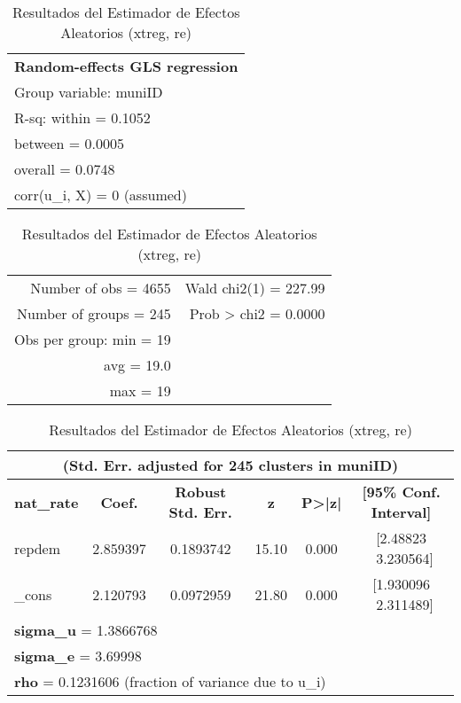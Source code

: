 \documentclass[12pt]{article}
\begin{document}
\begin{table}[H] %
    \centering
    \caption{Resultados del Estimador de Efectos Aleatorios (xtreg, re)}
    \begin{tabular}{l l r}
        \multicolumn{3}{l}{\textbf{Random-effects GLS regression}} \\
        \multicolumn{3}{l}{Group variable: muniID} \\
        \hline
        \multicolumn{3}{l}{R-sq: \hspace{5mm} within = 0.1052} \\
        \multicolumn{3}{l}{\hspace{17mm} between = 0.0005} \\
        \multicolumn{3}{l}{\hspace{17mm} overall = 0.0748} \\
        \multicolumn{3}{l}{corr(u\_i, X) = 0 (assumed)} \\
    \end{tabular}
    \begin{tabular}{r @{\hskip 1cm} r}
        Number of obs = 4655 & Wald chi2(1) = 227.99 \\
        Number of groups = 245 & Prob > chi2 = 0.0000 \\
        Obs per group: min = 19 & \\
        \hspace{16mm} avg = 19.0 & \\
        \hspace{16mm} max = 19 & \\
    \end{tabular}

    \vspace{0.2cm}
    \begin{tabular}{l c c c c c}
        \multicolumn{6}{c}{(Std. Err. adjusted for 245 clusters in muniID)} \\
        \hline
        \textbf{nat\_rate} & \textbf{Coef.} & \textbf{Robust Std. Err.} & \textbf{z} & \textbf{P>|z|} & \textbf{[95\% Conf. Interval]} \\
        \hline
        repdem & 2.859397 & 0.1893742 & 15.10 & 0.000 & [2.48823 \ 3.230564] \\
        \_cons & 2.120793 & 0.0972959 & 21.80 & 0.000 & [1.930096 \ 2.311489] \\
        \hline
        \multicolumn{6}{l}{\textbf{sigma\_u} = 1.3866768} \\
        \multicolumn{6}{l}{\textbf{sigma\_e} = 3.69998} \\
        \multicolumn{6}{l}{\textbf{rho} = 0.1231606 \hspace{2mm} (fraction of variance due to u\_i)} \\
        \hline
    \end{tabular}
\end{table}
\end{document}
